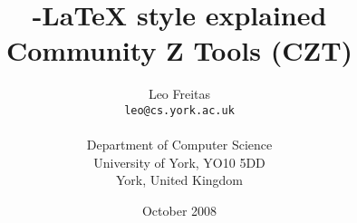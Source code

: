\documentclass{article}
\newcommand{\emfile}[1]{\texttt{#1}}%
\begin{document}
\title{\Circus-\LaTeX{} style explained\\ Community Z Tools (CZT)}
\author{Leo Freitas \\ \texttt{leo@cs.york.ac.uk} \\ \\ Department of Computer Science \\ University of York, YO10 5DD \\ York, United Kingdom \\ }
\date{October 2008}
\maketitle

\tableofcontents
\listoftables

%
%
%
%
\end{document}
